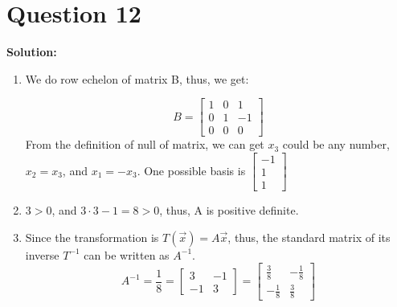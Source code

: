 \documentclass[11pt]{article} %
\begin{document}
\section{Question 12}
\textbf{Solution:}

\begin{enumerate}
	\item We do row echelon of matrix B, thus, we get:
	
	$$B=\begin{bmatrix}
		1&0&1\\
		0&1&-1\\
		0&0&0
	\end{bmatrix}$$
	From the definition of null of matrix, we can get $x_3$ could be any number, $x_2=x_3$, and $x_1=-x_3$.
	One possible basis is $\begin{bmatrix}
		-1\\1\\1
	\end{bmatrix}$

\item $3>0$, and $3\cdot 3-1=8>0$, thus, A is positive definite. 
\item Since the transformation is $T(\vec{x})=A\vec{x}$, thus, the standard matrix of its inverse $T^{-1}$ can be written as $A^{-1}$. 
$$A^{-1}=\frac{1}{8}=\begin{bmatrix}
	3&-1\\-1&3
\end{bmatrix}=\begin{bmatrix}
\frac{3}{8}&-\frac{1}{8}\\-\frac{1}{8}&\frac{3}{8}
\end{bmatrix}$$


\end{enumerate}
\end{document}
